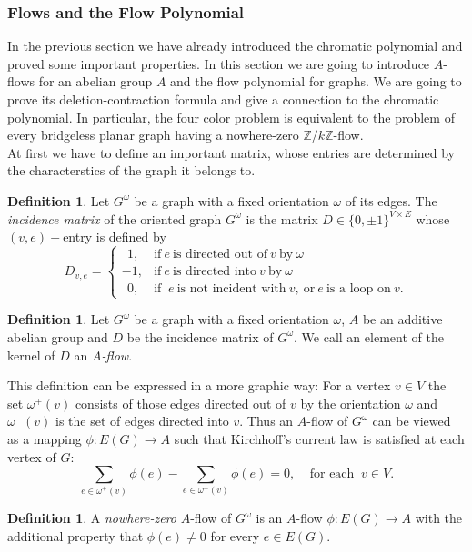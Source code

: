 \documentclass[12pt,a4paper, twoside, autooneside=false]{scrartcl}
\theoremstyle{definition}
\newtheorem{definition}[theorem]{Definition}
\theoremstyle{remark}
\numberwithin{equation}{section}
\begin{document}
\subsubsection{Flows and the Flow Polynomial}
In the previous section we have already introduced the chromatic polynomial and proved some important properties. In this section we are going to introduce $A$-flows for an abelian group $A$ and the flow polynomial for graphs. We are going to prove its deletion-contraction formula and give a connection to the chromatic polynomial. In particular, the four color problem is equivalent to the problem of every bridgeless planar graph having a nowhere-zero $\mathbb{Z}/k\mathbb{Z}$-flow. \\
\indent At first we have to define an important matrix, whose entries are determined by the characterstics of the graph it belongs to. 
\begin{definition}
Let $G^\omega$ be a graph with a fixed orientation $\omega$ of its edges. The \textit{incidence matrix} of the oriented graph $G^\omega$ is the matrix $D \in \{0, \pm 1\}^{V \times E}$ whose $(v,e)-$entry is defined by \[
D_{v,e} = \begin{cases}
\ \ 1, & \text{if} \ e \ \text{is directed out of} \ v \ \text{by} \ \omega \\ 
-1, & \text{if} \ e \ \text{is directed into} \ v \ \text{by} \ \omega \\ 
\ \ 0, & \text{if } \ e \ \text{is not incident with} \ v, \ \text{or} \ e \ \text{is a loop on} \ v. 
\end{cases}
\]
\end{definition}
\begin{definition}
Let $G^\omega$ be a graph with a fixed orientation $\omega$, $A$ be an additive abelian group and $D$ be the incidence matrix of $G^\omega$. We call an element of the kernel of $D$ an $A$\textit{-flow}.
\end{definition}
This definition can be expressed in a more graphic way: For a vertex $v \in V$ the set $\omega^+(v)$ consists of those edges directed out of $v$ by the orientation $\omega$ and $\omega^-(v)$ is the set of edges directed into $v$. Thus an $A$-flow of $G^\omega$ can be viewed as a mapping $\phi: E(G) \to A$ such that Kirchhoff's current law is satisfied at each vertex of $G$: 
\[
\sum_{e \in \omega^+(v)} \phi(e) - \sum_{e \in \omega^-(v)}\phi(e) = 0, \ \ \ \ \ \text{for each } \ v \in V.
\]
\begin{definition}
A \textit{nowhere-zero} $A$-flow of $G^\omega$ is an $A$-flow $\phi: E(G) \to A$ with the additional property that $\phi(e) \neq 0$ for every $e \in E(G)$.
\end{definition}
\end{document}
